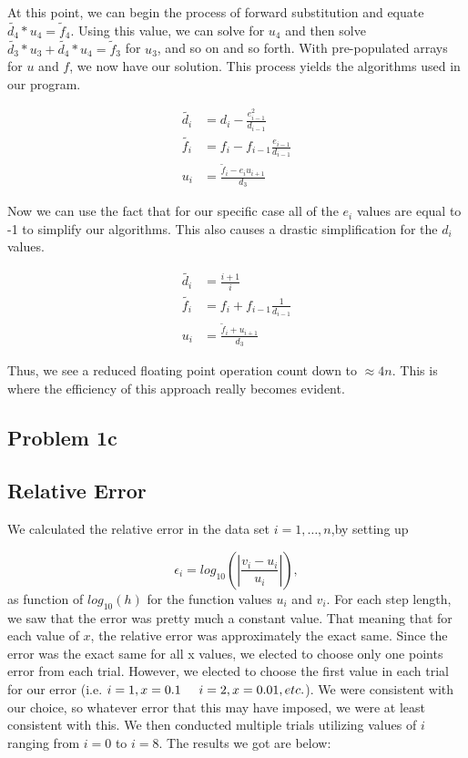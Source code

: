 \documentclass{article}
\begin{document}
At this point, we can begin the process of forward substitution and equate $\tilde{d_{4}} * u_{4} = \tilde{f}_{4}$. Using this value, we can solve for $u_{4}$ and then solve $\tilde{d_{3}} * u_{3} + \tilde{d_{4}} * u_{4} = \tilde{f}_{3}$ for $u_{3}$, and so on and so forth. With pre-populated arrays for $u$ and $f$, we now have our solution. This process yields the algorithms used in our program.


\begin{align}
\tilde{d_{i}} &= d_{i}-\frac{e_{i-1}^{2}}{d_{i-1}} \\
\tilde{f_{i}} &= f_{i} - f_{i-1} \frac{e_{i-1}}{d_{i-1}} \\
u_{i} &= \frac{	\tilde{f}_{i} - e_{i}u_{i+1}}{d_{3}}
\end{align}

Now we can use the fact that for our specific case all of the $e_{i}$ values are equal to -1 to simplify our algorithms. This also causes a drastic simplification for the $d_{i}$ values. 

\begin{align}
\tilde{d_{i}} &= \frac{i+1}{i} \\
\tilde{f_{i}} &= f_{i} + f_{i-1} \frac{1}{d_{i-1}} \\
u_{i} &= \frac{	\tilde{f}_{i} + u_{i+1}}{d_{3}}
\end{align}

Thus, we see a reduced floating point operation count down to $\approx 4n$. This is where the efficiency of this approach really becomes evident. 

\subsection{Problem 1c}

\subsection{Relative Error}
We calculated the relative error in the data set $i=1,\dots, n$,by setting up

\[
\epsilon_i=log_{10}\left(\left|\frac{v_i-u_i}
{u_i}\right|\right),
\]
as function of $log_{10}(h)$ for the function values $u_i$ and $v_i$.
For each step length, we saw that the error was pretty much a constant value. That meaning that for each value of $x$, the relative error was approximately the exact same. Since the error was the exact same for all x values, we elected to choose only one points error from each trial. However, we elected to choose the first value in each trial for our error (i.e. $i=1, x= 0.1 \hspace{0.5cm} i=2, x = 0.01, etc.$). We were consistent with our choice, so whatever error that this may have imposed, we were at least consistent with this. We then conducted multiple trials utilizing values of $i$ ranging from $i=0$ to $i=8$. The results we got are below:
\end{document}
